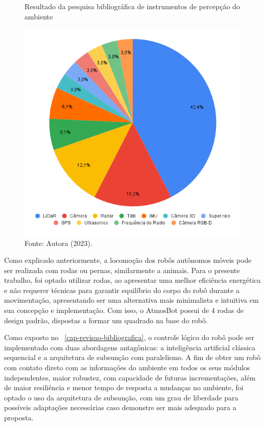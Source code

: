 \begin{figure}[h]
    \centering
    \caption{Resultado da pesquisa bibliográfica de instrumentos de percepção do ambiente}
    \includegraphics[scale=0.55]{resultadosPercepcao.png}
    \caption*{Fonte: Autora (2023).}
    \label{fig:graficoPesquisaPercepcao}
\end{figure}

Como explicado anteriormente, a locomoção dos robôs autônomos móveis pode ser realizada com rodas ou pernas, similarmente a animais. Para o presente trabalho, foi optado utilizar rodas, ao apresentar uma melhor eficiência energética e não requerer técnicas para garantir equilíbrio do corpo do robô durante a movimentação, apresentando ser uma alternativa mais minimalista e intuitiva em sua concepção e implementação.  Com isso, o AtmosBot possui de 4 rodas de design padrão, dispostas a formar um quadrado na base do robô.

Como exposto no \chapterautorefname~\ref{cap-revisao-bibliografica}, o controle lógico do robô pode ser implementado com duas abordagens antagônicas: a inteligência artificial clássica sequencial e a arquitetura de subsunção com paralelismo. A fim de obter um robô com contato direto com as informações do ambiente em todos os seus módulos independentes, maior robustez, com capacidade de futuras incrementações, além de maior resiliência e menor tempo de resposta a mudanças no ambiente, foi optado o uso da arquitetura de subsunção, com um grau de liberdade para possíveis adaptações necessárias caso demonstre ser mais adequado para a proposta.


